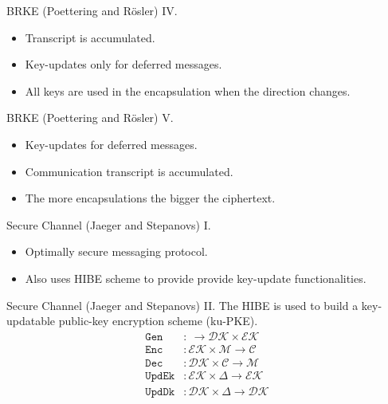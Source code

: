 \documentclass{beamer}
\begin{document}
\begin{frame}{BRKE (Poettering and Rösler) IV.}
  \scriptsize
  \begin{figure}[h]
        \centering
        \setlength{\fboxsep}{10pt}
        \scalebox{0.6}{%
        \fbox{%
          
        }
      }
    \end{figure}
       \begin{itemize}
       \item Transcript is accumulated.
       \item Key-updates only for deferred messages.
       \item All keys are used in the encapsulation when the direction changes.
       \end{itemize}
\end{frame}

\begin{frame}{BRKE (Poettering and Rösler) V.}
  \scriptsize
    \begin{figure}[h]
        \centering
        \setlength{\fboxsep}{10pt}
        \scalebox{0.6}{%
        \fbox{%
          
        }
      }
   \end{figure}
       \begin{itemize}
       \item Key-updates for deferred messages.
       \item Communication transcript is accumulated.
       \item The more encapsulations the bigger the ciphertext.
       \end{itemize}
\end{frame}

\begin{frame}{Secure Channel (Jaeger and Stepanovs) I.}
  \begin{itemize}
  \item Optimally secure messaging protocol.
  \item Also uses HIBE scheme to provide provide key-update
    functionalities.
  \end{itemize}
\end{frame}

\begin{frame}{Secure Channel (Jaeger and Stepanovs) II.}
  The HIBE is used to build a key-updatable public-key encryption scheme (ku-PKE).
  \begin{align*}
    \texttt{Gen} & : \ \rightarrow \mathcal{DK} \times \mathcal{EK} \\
    \texttt{Enc} & : \mathcal{EK} \times \mathcal{M} \rightarrow \mathcal{C} \\
    \texttt{Dec} & : \mathcal{DK} \times \mathcal{C} \rightarrow \mathcal{M} \\
    \texttt{UpdEk} & : \mathcal{EK} \times \Delta \rightarrow \mathcal{EK} \\
    \texttt{UpdDk} & : \mathcal{DK} \times \Delta \rightarrow \mathcal{DK}
  \end{align*}
\end{frame}
\end{document}
